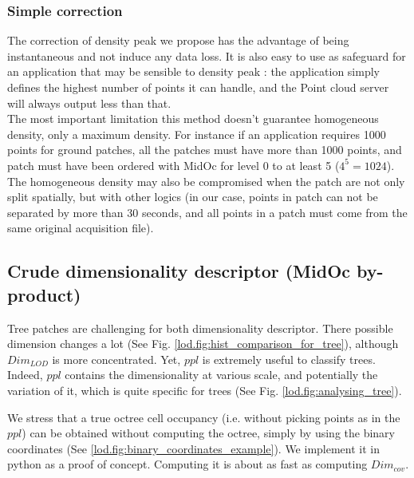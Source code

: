 		\subsubsection{Simple correction}
		The correction of density peak we propose has the advantage of being instantaneous and not induce any data loss.
		It is also easy to use as safeguard for an application that may be sensible to density peak : the application simply defines the highest number of points \per \cubic \meter it can handle, and the Point cloud server will always output less than that.
		\\
		The most important limitation this method doesn't guarantee homogeneous density, only a maximum density.
		For instance if an application requires 1000 points \per \cubic \meter for ground patches, all the patches must have more than 1000 points, and patch must have been ordered with MidOc for level 0 to at least 5 ($4^5=1024$). 
		The homogeneous density may also be compromised when the patch are not only split spatially, but with other logics (in our case, points in patch can not be separated by more than 30 seconds, and all points in a patch must come from the same original acquisition file).
		
	\subsection{Crude dimensionality descriptor (MidOc by-product)}	 
		
		Tree patches are challenging for both dimensionality descriptor.
		There possible dimension changes a lot (See Fig. \ref{lod.fig:hist_comparison_for_tree}), although $Dim_{LOD}$ is more concentrated.
		Yet, $ppl$ is extremely useful to classify trees.
		Indeed, $ppl$ contains the dimensionality at various scale, and potentially the variation of it, which is quite specific for trees (See Fig. \ref{lod.fig:analysing_tree}).
		  
			
		We stress that a true octree cell occupancy (i.e. without picking points as in the $ppl$) can be obtained without computing the octree, simply by using the binary coordinates (See \ref{lod.fig:binary_coordinates_example}).
		We implement it in python as a proof of concept. Computing it is about as fast as computing $Dim_{cov}$.
		
